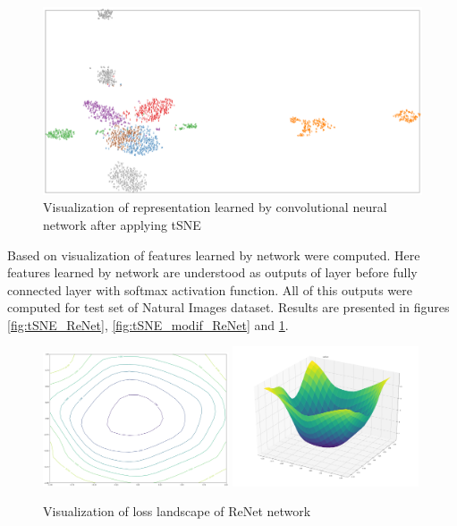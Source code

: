 \documentclass[a4paper, 10 pt, conference]{ieeeconf}
\begin{document}
\begin{figure}
\centering
	\includegraphics[width=1.0\textwidth]{img/tSNE_conv.png}
	\caption{Visualization of representation learned by convolutional neural network after applying tSNE}
	\label{fig:tSNE_conv}
\end{figure}

Based on \cite{tSNE} visualization of features learned by network were computed. Here features learned by network are understood as outputs of layer before fully connected layer with softmax activation function. All of this outputs were computed for test set of Natural Images dataset. Results are presented in figures \ref{fig:tSNE_ReNet}, \ref{fig:tSNE_modif_ReNet} and \ref{fig:tSNE_conv}.

\begin{figure}
\centering
	\includegraphics[width=0.49\textwidth]{img/loss_ReNet.png}
	\includegraphics[width=0.49\textwidth]{img/loss_3d_ReNet.png}
	\caption{Visualization of loss landscape of ReNet network}
	\label{fig:loss_ReNet}
\end{figure}
\end{document}
